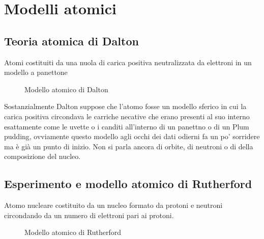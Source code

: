 
\chapter{Modelli atomici}
\label{chap:modAtom}

\section{Teoria atomica di Dalton}
\label{sec:teoriaatomdidalton}
\begin{tteor}
  Atomi costituiti da una nuola di carica positiva neutralizzata da elettroni in un modello a panettone
\end{tteor}
\begin{figure}[ht!]
  \centering
  
  \caption{Modello atomico di Dalton}
  \label{fig:modatomDalton}
\end{figure}
Sostanzialmente Dalton suppose che l'atomo fosse un modello sferico in cui la carica positiva circondava
le carriche necative che erano presenti al suo interno esattamente come le uvette o i canditi
all'interno di un panettno o di un Plum pudding, ovviamente questo modello agli occhi dei dati odierni
fa un po' sorridere ma è già un punto di inizio. Non si parla ancora di orbite, di neutroni o di della
composizione del nucleo.

\section{Esperimento e modello atomico di Rutherford}
\label{sec:rutherford}

\begin{tteor}
  Atomo nucleare costituito da un nucleo formato da protoni e neutroni circondando da un numero di
  elettroni pari ai protoni.
\end{tteor}
\begin{figure}[ht!]
  \centering
  
  \caption{Modello atomico di Rutherford}
  \label{fig:modatomRutherford}
\end{figure}

